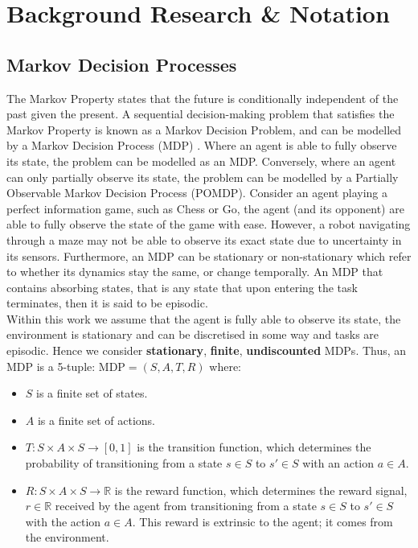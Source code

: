 \chapter{Background Research \& Notation}
\label{chapter2}
\section{Markov Decision Processes}
The Markov Property states that the future is conditionally independent of the past given the present. A sequential decision-making problem that satisfies the Markov Property is known as a Markov Decision Problem, and can be modelled by a Markov Decision Process (MDP) \citep{10.5555/528623}. Where an agent is able to fully observe its state, the problem can be modelled as an MDP. Conversely, where an agent can only partially observe its state, the problem can be modelled by a Partially Observable Markov Decision Process (POMDP).
Consider an agent playing a perfect information game, such as Chess or Go, the agent (and its opponent) are able to fully observe the state of the game with ease. However, a robot navigating through a maze may not be able to observe its exact state due to uncertainty in its sensors.
Furthermore, an MDP can be stationary or non-stationary which refer to whether its dynamics stay the same, or change temporally.
An MDP that contains absorbing states, that is any state that upon entering the task terminates, then it is said to be episodic.
\\Within this work we assume that the agent is fully able to observe its state, the environment is stationary and can be discretised in some way and tasks are episodic.
Hence we consider \textbf{stationary}, \textbf{finite}, \textbf{undiscounted} MDPs.
Thus, an MDP is a 5-tuple: $\text{MDP} = (S,A,T,R)$ where:
\begin{itemize}
    \item $S$ is a finite set of states.
    \item $A$ is a finite set of actions.
    \item $T : S \times A \times S \rightarrow [0,1]$ is the transition function, which determines the probability of transitioning from a state $s \in S$ to $s' \in S$ with an action $a \in A$.
    \item $R:S \times A \times S \rightarrow \mathbb{R}$ is the reward function, which determines the reward signal, $r \in \mathbb{R}$ received by the agent from transitioning from a state $s \in S$ to $s' \in S$ with the action $a \in A$. This reward is extrinsic to the agent; it comes from the environment.
\end{itemize}
